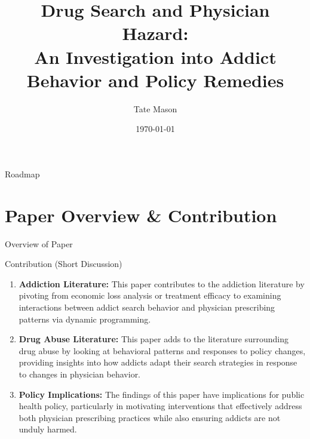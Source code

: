 \documentclass[aspectratio=169,professionalfonts]{beamer}
\title[Drug Search]{Drug Search and Physician Hazard: \\
An Investigation into Addict Behavior and Policy Remedies}
\author[Tate Mason]{Tate Mason}
\institute[UGA]{John Munro Godfrey Sr. Dept. of Economics \\ University of Georgia}
\date{\today}
\newcommand{\hl}[1]{\textbf{\textcolor{UGARed}{#1}}}
\begin{document}
\begin{frame}
  \titlepage
\end{frame}

\begin{frame}{Roadmap}
  \tableofcontents
\end{frame}

\section{Paper Overview \& Contribution}

\begin{frame}{Overview of Paper}
\end{frame}

\begin{frame}{Contribution (Short Discussion)}
  \begin{enumerate}
    \item \hl{Addiction Literature:} This paper contributes to the addiction literature by pivoting from economic loss analysis or treatment efficacy to examining  interactions between addict search behavior and physician prescribing patterns via dynamic programming.
    \item \hl{Drug Abuse Literature:} This paper adds to the literature surrounding drug abuse by looking at behavioral patterns and responses to policy changes, providing insights into how addicts adapt their search strategies in response to changes in physician behavior.
    \item \hl{Policy Implications:} The findings of this paper have implications for public health policy, particularly in motivating interventions that effectively address both physician prescribing practices while also ensuring addicts are not unduly harmed.
  \end{enumerate}
\end{frame}
\end{document}
